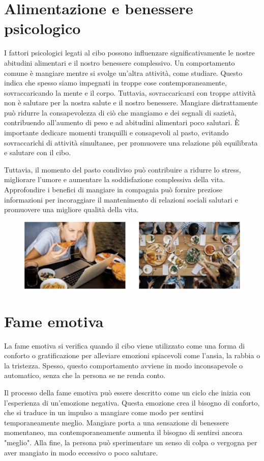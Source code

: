 \documentclass[12pt,oneside,a4paper]{article}
\begin{document}
\section{Alimentazione e benessere psicologico } \label{sec:aleben}
I fattori psicologici legati al cibo possono influenzare significativamente le nostre abitudini alimentari e il nostro benessere complessivo. Un comportamento comune è mangiare mentre si svolge un'altra attività, come studiare. Questo indica che spesso siamo impegnati in troppe cose contemporaneamente, sovraccaricando la mente e il corpo. Tuttavia, sovraccaricarsi con troppe attività non è salutare per la nostra salute e il nostro benessere. Mangiare distrattamente può ridurre la consapevolezza di ciò che mangiamo e dei segnali di sazietà, contribuendo all'aumento di peso e ad abitudini alimentari poco salutari. È importante dedicare momenti tranquilli e consapevoli al pasto, evitando sovraccarichi di attività simultanee, per promuovere una relazione più equilibrata e salutare con il cibo. 

Tuttavia, il momento del pasto condiviso può contribuire a ridurre lo stress, migliorare l'umore e aumentare la soddisfazione complessiva della vita. Approfondire i benefici di mangiare in compagnia può fornire preziose informazioni per incoraggiare il mantenimento di relazioni sociali salutari e promuovere una migliore qualità della vita. 
\begin{figure}[h]
    \centering
    \includegraphics[width=.9\textwidth]{cibo1.png}
    \label{fig:my_label}
\end{figure}

\section{Fame emotiva } \label{sec:famem}
La fame emotiva si verifica quando il cibo viene utilizzato come una forma di conforto o gratificazione per alleviare emozioni spiacevoli come l'ansia, la rabbia o la tristezza. Spesso, questo comportamento avviene in modo inconsapevole o automatico, senza che la persona se ne renda conto. 

Il processo della fame emotiva può essere descritto come un ciclo che inizia con l'esperienza di un'emozione negativa. Questa emozione crea il bisogno di conforto, che si traduce in un impulso a mangiare come modo per sentirsi temporaneamente meglio. Mangiare porta a una sensazione di benessere momentaneo, ma contemporaneamente aumenta il bisogno di sentirsi ancora "meglio". Alla fine, la persona può sperimentare un senso di colpa o vergogna per aver mangiato in modo eccessivo o poco salutare. 
\end{document}
